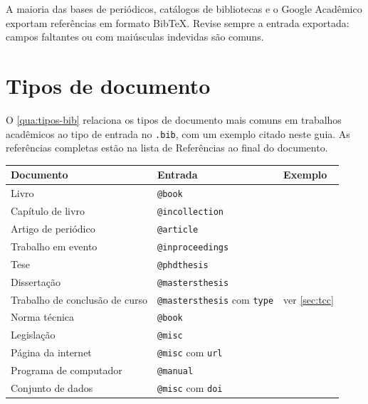 A maioria das bases de periódicos, catálogos de bibliotecas e o Google Acadêmico exportam referências em formato Bib\TeX. Revise sempre a entrada exportada: campos faltantes ou com maiúsculas indevidas são comuns.

\section{Tipos de documento}\label{sec:tipos-documento}

O \autoref{qua:tipos-bib} relaciona os tipos de documento mais comuns em trabalhos acadêmicos ao tipo de entrada no \texttt{.bib}, com um exemplo citado neste guia. As referências completas estão na lista de Referências ao final do documento.

\begin{quadro}[htbp]
	\caption{Tipos de documento e entradas no arquivo .bib}\label{qua:tipos-bib}
	\centering
	\small
	\begin{tabular}{p{}p{}p{}}
		\toprule
		\textbf{Documento} & \textbf{Entrada} & \textbf{Exemplo} \\
		\midrule
		Livro & \texttt{@book} & \cite{lamport1994} \\
		Capítulo de livro & \texttt{@incollection} & \cite{brooks1995} \\
		Artigo de periódico & \texttt{@article} & \cite{wilson2017} \\
		Trabalho em evento & \texttt{@inproceedings} & \cite{dean2004} \\
		Tese & \texttt{@phdthesis} & \cite{fielding2000} \\
		Dissertação & \texttt{@mastersthesis} & \cite{shannon1940} \\
		Trabalho de conclusão de curso & \texttt{@mastersthesis} com \texttt{type} & ver \autoref{sec:tcc} \\
		Norma técnica & \texttt{@book} & \cite{abnt14724} \\
		Legislação & \texttt{@misc} & \cite{brasil1998} \\
		Página da internet & \texttt{@misc} com \texttt{url} & \cite{semver} \\
		Programa de computador & \texttt{@manual} & \cite{biblatexabnt} \\
		Conjunto de dados & \texttt{@misc} com \texttt{doi} & \cite{fisher1936} \\
		\bottomrule
	\end{tabular}
\end{quadro}

